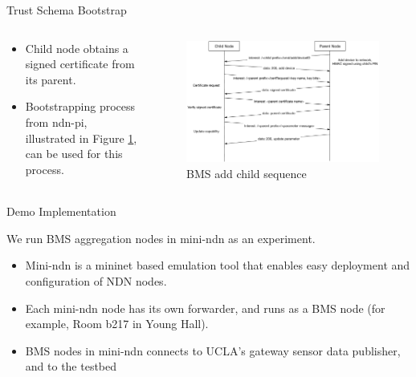 \documentclass[final,hyperref={pdfpagelabels=false},20pt]{beamer}
\begin{document}
\begin{frame}[t]
\begin{columns}[t]
\begin{column}{.465\textwidth}
\begin{block}{Trust Schema}
Bootstrap

\begin{columns}[T]

\begin{column}{.35\textwidth}

\begin{itemize}
\item{Child node obtains a signed certificate from its parent.}
\item{Bootstrapping process from ndn-pi, illustrated in Figure \ref{fig:add-child-sequence}, can be used for this process.}
\end{itemize}
\end{column}

\begin{column}{.65\textwidth}
\begin{figure}
\includegraphics[width=\linewidth]{bms-add-child-sequence}
\caption{BMS add child sequence}
\label{fig:add-child-sequence}
\end{figure}
\end{column}

\end{columns}

\end{block}


\begin{block}{Demo Implementation}

We run BMS aggregation nodes in mini-ndn as an experiment.

\begin{itemize}
\item{Mini-ndn is a mininet based emulation tool that enables easy deployment and configuration of NDN nodes. \cite{minindn-github}}
\item{Each mini-ndn node has its own forwarder, and runs as a BMS node (for example, Room b217 in Young Hall).}
\item{BMS nodes in mini-ndn connects to UCLA's gateway sensor data publisher, and to the testbed}
\end{itemize}


\end{block}
\end{column}
\end{columns}
\end{frame}
\end{document}
